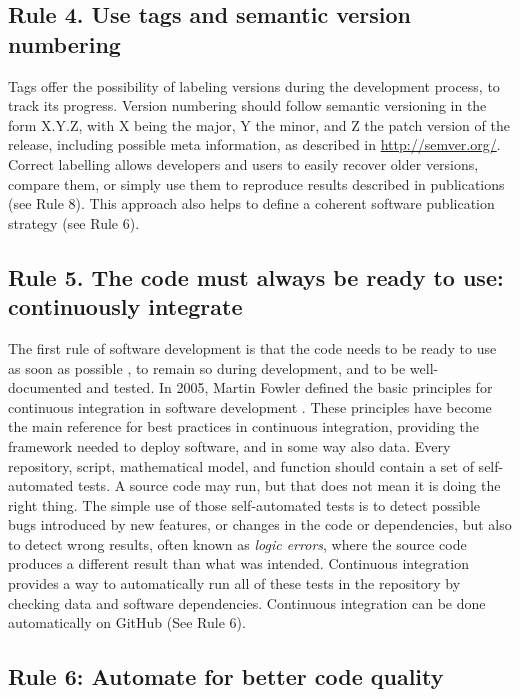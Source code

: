 \documentclass[10pt,letterpaper]{article}
\begin{document}
\subsection*{Rule 4. Use tags and semantic version
numbering}\label{rule-4.-use-tags-and-semantic-version-numbering}

Tags offer the possibility of labeling versions during the development
process, to track its progress. Version numbering should follow semantic
versioning in the form X.Y.Z, with X being the major, Y the minor, and Z
the patch version of the release, including possible meta information,
as described in \url{http://semver.org/}. Correct labelling allows developers
and users to easily recover older versions, compare them, or simply use
them to reproduce results described in publications (see Rule 8). This
approach also helps to define a coherent software publication
strategy (see Rule 6).

\subsection*{Rule 5. The code must always be ready to use: continuously
integrate}\label{rule-5.-the-code-must-always-be-ready-to-use-continuously-integrate}

The first rule of software development is that the code needs to be
ready to use as soon as possible \cite{Leprevost:2014}, to remain so during
development, and to be well-documented and tested. In 2005, Martin
Fowler defined the basic principles for continuous integration in
software development \cite{FowlerCI}. These principles have become the
main reference for best practices in continuous integration, providing
the framework needed to deploy software, and in some way also data.
Every repository, script, mathematical model, and function should
contain a set of self-automated tests. A source code may run, but that
does not mean it is doing the right thing. The simple use of those
self-automated tests is to detect possible bugs introduced by new
features, or changes in the code or dependencies, but also to detect
wrong results, often known as \emph{logic errors}, where the source code
produces a different result than what was intended.
Continuous integration provides a way to automatically run all
of these tests in the repository by checking data and software
dependencies. Continuous integration can be done automatically on GitHub
(See Rule 6).

\subsection*{Rule 6: Automate for better code
quality}\label{rule-6-automate-for-better-code-quality}
\end{document}
